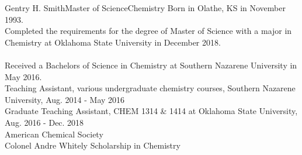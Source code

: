 \newpage
\begin{vita}{Gentry H. Smith}{Master of Science}{Chemistry} %
     Born in Olathe, KS in November 1993. 
     \\ Completed the requirements for the degree of Master of Science with a major in Chemistry at Oklahoma State University in December 2018. \\ \\
    Received a Bachelors of Science in Chemistry at Southern Nazarene University in May 2016.
     \\ Teaching Assistant, various undergraduate chemistry courses, Southern Nazarene University, Aug. 2014 - May 2016 \\ Graduate Teaching Assistant, CHEM 1314 \& 1414 at Oklahoma State University, Aug. 2016 - Dec. 2018
     \\ American Chemical Society
    \\ Colonel Andre Whitely Scholarship in Chemistry
\end{vita}
